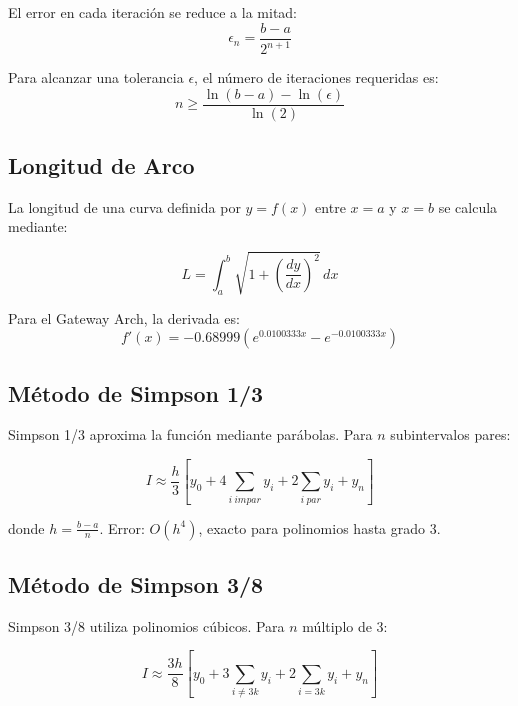 \documentclass[conference]{IEEEtran}
\begin{document}
El error en cada iteración se reduce a la mitad:
\begin{equation}
\epsilon_n = \frac{b-a}{2^{n+1}}
\end{equation}

Para alcanzar una tolerancia $\epsilon$, el número de iteraciones requeridas es:
\begin{equation}
n \geq \frac{\ln(b-a) - \ln(\epsilon)}{\ln(2)}
\end{equation}

\subsection{Longitud de Arco}

La longitud de una curva definida por $y = f(x)$ entre $x = a$ y $x = b$ se calcula mediante:

\begin{equation}
L = \int_{a}^{b} \sqrt{1 + \left(\frac{dy}{dx}\right)^2} \, dx
\end{equation}

Para el Gateway Arch, la derivada es:
\begin{equation}
f'(x) = -0.68999\left(e^{0.0100333x} - e^{-0.0100333x}\right)
\end{equation}

\subsection{Método de Simpson 1/3}

Simpson 1/3 aproxima la función mediante parábolas. Para $n$ subintervalos pares:

\begin{equation}
I \approx \frac{h}{3}\left[y_0 + 4\sum_{i\ impar}y_i + 2\sum_{i\ par}y_i + y_n\right]
\end{equation}

donde $h = \frac{b-a}{n}$. Error: $O(h^4)$, exacto para polinomios hasta grado 3.

\subsection{Método de Simpson 3/8}

Simpson 3/8 utiliza polinomios cúbicos. Para $n$ múltiplo de 3:

\begin{equation}
I \approx \frac{3h}{8}\left[y_0 + 3\sum_{i\neq 3k}y_i + 2\sum_{i=3k}y_i + y_n\right]
\end{equation}
\end{document}

